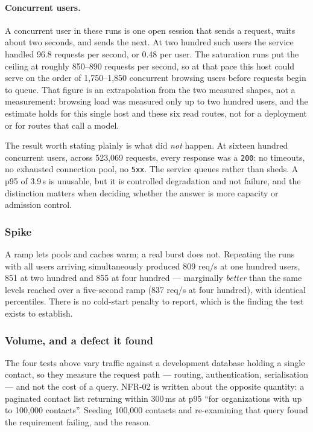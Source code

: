 \documentclass[a4paper]{article}
\begin{document}
\paragraph{Concurrent users.} A concurrent user in these runs is one open
session that sends a request, waits about two seconds, and sends the next. At
two hundred such users the service handled 96.8 requests per second, or 0.48 per
user. The saturation runs put the ceiling at roughly 850--890 requests per
second, so at that pace this host could serve on the order of 1{,}750--1{,}850
concurrent browsing users before requests begin to queue. That figure is an
extrapolation from the two measured shapes, not a measurement: browsing load
was measured only up to two hundred users, and the estimate holds for this
single host and these six read routes, not for a deployment or for routes that
call a model.

The result worth stating plainly is what did \emph{not} happen. At sixteen
hundred concurrent users, across 523{,}069 requests, every response was a
\texttt{200}: no timeouts, no exhausted connection pool, no \texttt{5xx}. The
service queues rather than sheds. A p95 of 3.9\,s is unusable, but it is
controlled degradation and not failure, and the distinction matters when
deciding whether the answer is more capacity or admission control.

\subsubsection{Spike}

A ramp lets pools and caches warm; a real burst does not. Repeating the runs
with all users arriving simultaneously produced 809 req/s at one hundred users,
851 at two hundred and 855 at four hundred --- marginally \emph{better} than the
same levels reached over a five-second ramp (837 req/s at four hundred), with
identical percentiles. There is no cold-start penalty to report, which is the
finding the test exists to establish.

\subsubsection{Volume, and a defect it found}
\label{sec:volume-test}

The four tests above vary traffic against a development database holding a
single contact, so they measure the request path --- routing, authentication,
serialisation --- and not the cost of a query. NFR-02 is written about the
opposite quantity: a paginated contact list returning within 300\,ms at p95
``for organizations with up to 100,000 contacts''. Seeding 100{,}000 contacts
and re-examining that query found the requirement failing, and the reason.
\end{document}
